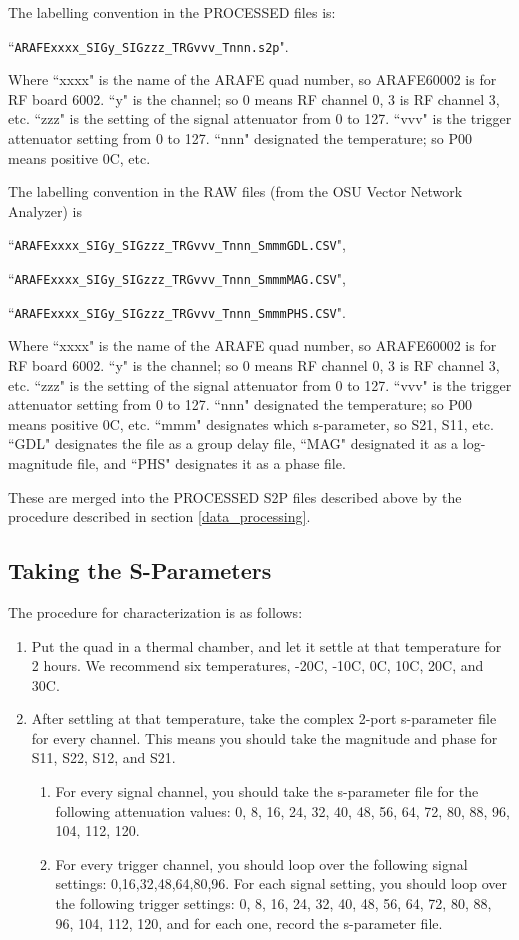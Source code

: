\documentclass[letter,12pt]{article}
\begin{document}
The labelling convention in the PROCESSED files is: 

``\texttt{ARAFExxxx\_SIGy\_SIGzzz\_TRGvvv\_Tnnn.s2p}".

Where ``xxxx" is the name of the ARAFE quad number, so ARAFE60002 is for RF board 6002. ``y" is the channel; so 0 means RF channel 0, 3 is RF channel 3, etc. ``zzz" is the setting of the signal attenuator from 0 to 127. ``vvv" is the trigger attenuator setting from 0 to 127. ``nnn" designated the temperature; so P00 means positive 0C,  etc.

The labelling convention in the RAW files (from the OSU Vector Network Analyzer) is 

``\texttt{ARAFExxxx\_SIGy\_SIGzzz\_TRGvvv\_Tnnn\_SmmmGDL.CSV}", 

``\texttt{ARAFExxxx\_SIGy\_SIGzzz\_TRGvvv\_Tnnn\_SmmmMAG.CSV}", 

``\texttt{ARAFExxxx\_SIGy\_SIGzzz\_TRGvvv\_Tnnn\_SmmmPHS.CSV}". 

Where ``xxxx" is the name of the ARAFE quad number, so ARAFE60002 is for RF board 6002. ``y" is the channel; so 0 means RF channel 0, 3 is RF channel 3, etc. ``zzz" is the setting of the signal attenuator from 0 to 127. ``vvv" is the trigger attenuator setting from 0 to 127. ``nnn" designated the temperature; so P00 means positive 0C,  etc. ``mmm" designates which s-parameter, so S21, S11, etc. ``GDL" designates the file as a group delay file, ``MAG" designated it as a log-magnitude file, and ``PHS" designates it as a phase file.

These are merged into the PROCESSED S2P files described above by the procedure described in section  \ref{data_processing}.
 
\subsection{Taking the S-Parameters}\label{sparams}

The procedure for characterization is as follows:
\begin{enumerate}
\item Put the quad in a thermal chamber, and let it settle at that temperature for 2 hours. We recommend six temperatures, -20C, -10C, 0C, 10C, 20C, and 30C.
\item After settling at that temperature, take the complex 2-port s-parameter file for every channel. This means you should take the magnitude and phase for S11, S22, S12, and S21.
\begin{enumerate}
\item For every signal channel, you should take the s-parameter file for the following attenuation values: 0, 8, 16, 24, 32, 40, 48, 56, 64, 72, 80, 88, 96, 104, 112, 120.
\item For every trigger channel, you should loop over the following signal settings: 0,16,32,48,64,80,96. For each signal setting, you should loop over the following trigger settings: 0, 8, 16, 24, 32, 40, 48, 56, 64, 72, 80, 88, 96, 104, 112, 120, and for each one, record the s-parameter file.
\end{enumerate}
\end{enumerate}
\end{document}
